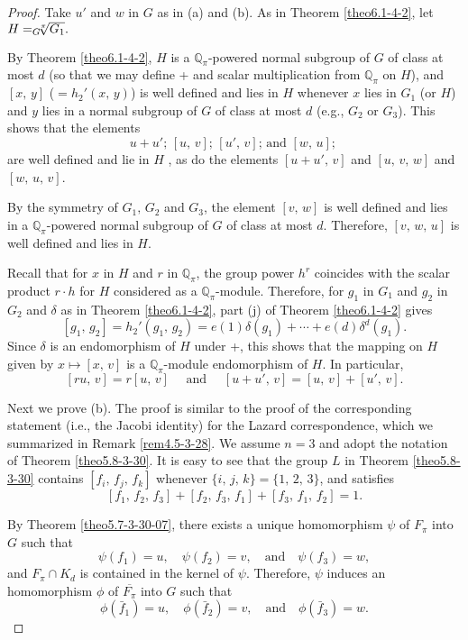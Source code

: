 \documentclass[mathscr]{amsart}
\theoremstyle{theorem}
\theoremstyle{definition}
\numberwithin{equation}{section}
\def \({\left(}
\def \){\right)}
\def\[{\left[}
\def\]{\right]}
\def\Q{\mathbb{Q}}
\def\ol{\overline}
\begin{document}
\begin{proof}
Take $u'$ and $w$ in $G$ as in (a) and (b). As in Theorem
\ref{theo6.1-4-2}, let $H=_{G}\hspace*{-0.2cm}\sqrt[\pi]{G_1}.$

By Theorem \ref{theo6.1-4-2}, $H$ is a $\Q_\pi$-powered normal
subgroup of $G$ of class at most $d$ (so that we may define + and
scalar multiplication from $\Q_\pi$ on $H$), and $[x,\,y]$
($=h_2'(x,\,y)$) is well defined and lies in $H$ whenever $x$ lies
in $G_1$ (or $H$) and $y$ lies in a normal subgroup of $G$ of class
at most $d$ (e.g., $G_2$ or $G_3$). This shows that the elements
$$u+u';\,[u,\,v];\,[u',\,v];\,\text{and }[w,\,u];\,$$
are well defined and lie in $H$ , as do the elements $[u+u',\,v]$
and $[u,\,v,\,w]$ and $[w,\,u,\,v]$.

By the symmetry of $G_1,\,G_2$ and $G_3$, the element $[v,\,w]$ is
well defined and lies in a $\Q_\pi$-powered normal subgroup of $G$
of class at most $d$. Therefore, $[v,\,w,\,u]$ is well defined and
lies in $H$.

Recall that for $x$ in $H$ and $r$ in $\Q_\pi$, the group power
$h^r$ coincides with the scalar product $r\cdot h$ for $H$
considered as a $\Q_\pi$-module. Therefore, for $g_1$ in $G_1$ and
$g_2$ in $G_2$ and $\delta$ as in Theorem \ref{theo6.1-4-2}, part
(j) of Theorem \ref{theo6.1-4-2} gives
$$\[g_1,\,g_2\]=h_2'\(g_1,\,g_2\)=e(1)\delta\(g_1\)+\cdots+e(d)\delta^d\(g_1\).$$
Since $\delta$ is an endomorphism of $H$ under +, this shows that
the mapping on $H$ given by $x\mapsto\[x,\,v\]$ is a $\Q_\pi$-module
endomorphism of $H$. In particular,
\begin{equation}\label{eq6.5-4-2}
[ru,\,v]=r[u,\,v]\quad\text{ and }\quad[u+u',\,v]=[u,\,v]+[u',\,v].
\end{equation}

Next we prove (b). The proof is similar to the proof of the
corresponding statement (i.e., the Jacobi identity) for the Lazard
correspondence, which we summarized in Remark \ref{rem4.5-3-28}. We
assume $n=3$ and adopt the notation of Theorem \ref{theo5.8-3-30}.
It is easy to see that the group $L$ in Theorem \ref{theo5.8-3-30}
contains $\[f_i,\,f_j,\,f_k\]$ whenever
$\{i,\,j,\,k\}=\{1,\,2,\,3\}$, and satisfies
\begin{equation}\label{eq6.6-4-2}
\[f_1,\,f_2,\,f_3\]+\[f_2,\,f_3,\,f_1\]+\[f_3,\,f_1,\,f_2\]=1.
\end{equation}

By Theorem \ref{theo5.7-3-30-07}, there exists a unique homomorphism
$\psi$ of $F_\pi$ into $G$ such that
$$\psi\(f_1\)=u,\quad\psi\(f_2\)=v,\quad\text{and}\quad\psi\(f_3\)=w,$$
and $F_\pi\cap K_d$ is contained in the kernel of $\psi.$ Therefore,
$\psi$ induces an homomorphism $\phi$ of $\ol{F_\pi}$ into $G$ such
that
$$\phi\(\bar f_1\)=u,\quad\phi\(\bar f_2\)=v,\quad\text{and}\quad\phi\(\bar f_3\)=w.$$


\end{proof}
\end{document}
